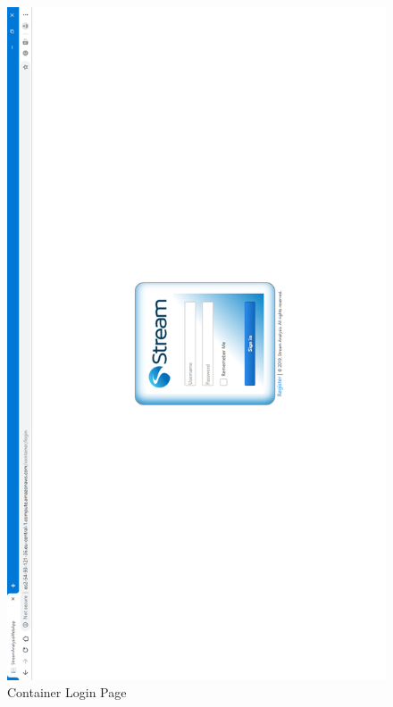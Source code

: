 \begin{figure}[p]
	\centering
	\noindent
	\includegraphics[width=0.5\paperwidth]{./images/guide/container/login.PNG}
	\caption{Container Login Page}
	\label{fig:containerLogin}
\end{figure}

